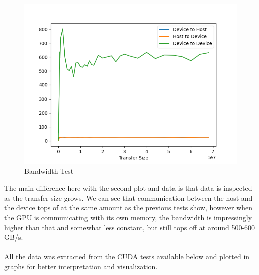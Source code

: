 \documentclass[english]{exam}
\begin{document}
\begin{figure}[h]
\centerline{\includegraphics[scale=0.5]{plt2.png}}
\caption{Bandwidth Test}
\label{fig}
\end{figure}

\noindent
The main difference here with the second plot and data is that data is inspected as the transfer size grows. We can see that communication between the host and the device tops of at the same amount as the previous tests show, however when the GPU is communicating with its own memory, the bandwidth is impressingly higher than that and somewhat less constant, but still tops off at around 500-600 GB/s.
\\\\
All the data was extracted from the CUDA tests available below and plotted in graphs for better interpretation and visualization.
\end{document}
